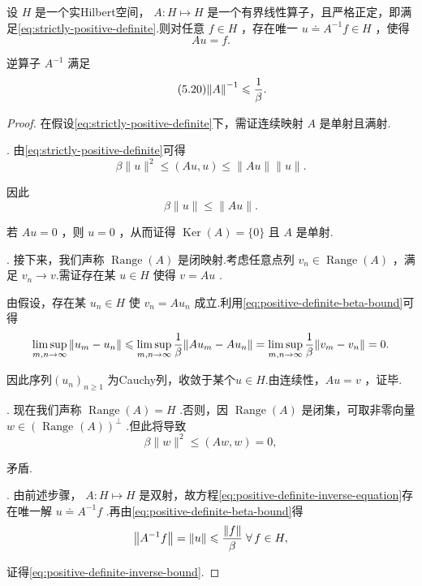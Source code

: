 \begin{theorem}[正定算子的逆]\label{thm:inverse-positive-definite-operator}
设 $H$ 是一个实Hilbert空间， $A : H \mapsto  H$ 是一个有界线性算子，且严格正定，即满足\eqref{eq:strictly-positive-definite}.则对任意 $f \in  H$ ，存在唯一 $u \doteq  {A}^{-1}f \in  H$ ，使得
\begin{equation}\tag{5.19}\label{eq:positive-definite-inverse-equation}
{Au} = f.
\end{equation}

逆算子 ${A}^{-1}$ 满足
\begin{equation}\tag{5.20}\label{eq:positive-definite-inverse-bound}
\norm{A}^{-1} \leqslant  \frac{1}{\beta }.
\end{equation}

\end{theorem}

\begin{proof}
在假设\eqref{eq:strictly-positive-definite}下，需证连续映射 $A$ 是单射且满射.

. 由\eqref{eq:strictly-positive-definite}可得
\[
\beta \| u{\| }^{2} \leq  \left( {{Au},u}\right)  \leq  \| {Au}\| \| u\| .
\]

因此
\begin{equation}\tag{5.21}\label{eq:positive-definite-beta-bound}
\beta \| u\|  \leq  \| {Au}\| .
\end{equation}

若 ${Au} = 0$ ，则 $u = 0$ ，从而证得 $\operatorname{Ker}\left( A\right)  = \{ 0\}$ 且 $A$ 是单射.

. 接下来，我们声称 $\operatorname{Range}\left( A\right)$ 是闭映射.考虑任意点列 ${v}_{n} \in  \operatorname{Range}\left( A\right)$ ，满足 ${v}_{n} \rightarrow  v$.需证存在某 $u \in  H$ 使得 $v = {Au}$ .

由假设，存在某 ${u}_{n} \in  H$ 使 ${v}_{n} = A{u}_{n}$ 成立.利用\eqref{eq:positive-definite-beta-bound}可得
\[
\mathop{\limsup }\limits_{{m,n \rightarrow  \infty }}\norm{{u}_{m} - {u}_{n}} \leqslant  \mathop{\limsup }\limits_{{m,n \rightarrow  \infty }}\frac{1}{\beta }\norm{A{u}_{m} - A{u}_{n}} = \mathop{\limsup }\limits_{{m,n \rightarrow  \infty }}\frac{1}{\beta }\norm{{v}_{m} - {v}_{n}} = 0.
\]

因此序列${\left( {u}_{n}\right) }_{n \geq  1}$ 为Cauchy列，收敛于某个$u \in  H$.由连续性，${Au} = v$ ，证毕.

. 现在我们声称 $\operatorname{Range}\left( A\right)  = H$ .否则，因 $\operatorname{Range}\left( A\right)$ 是闭集，可取非零向量 $w \in  {\left(  \text{ Range }\left( A\right) \right)  }^{ \bot  }$ .但此将导致
\[
\beta \| w{\| }^{2} \leq  \left( {{Aw},w}\right)  = 0,
\]

矛盾.

. 由前述步骤， $A : H \mapsto  H$ 是双射，故方程\eqref{eq:positive-definite-inverse-equation}存在唯一解 $u \doteq  {A}^{-1}f$ .再由\eqref{eq:positive-definite-beta-bound}得
\[
\norm{{A}^{-1}f} = \| u\|  \leqslant  \frac{\| f\| }{\beta }\;\forall\,f \in  H,
\]

证得\eqref{eq:positive-definite-inverse-bound}.
\end{proof}

